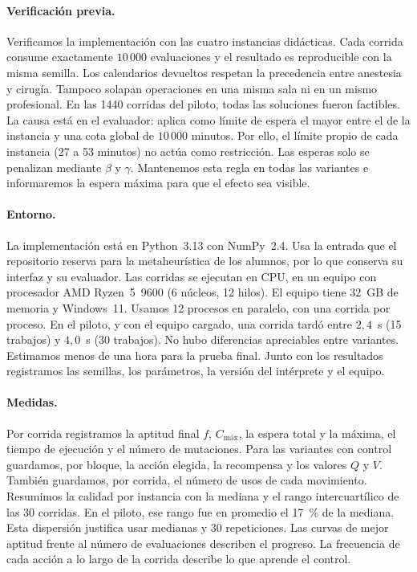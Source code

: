 \documentclass[10pt,a4paper]{article}
\newcommand{\Cmax}{C_{\text{máx}}}
\newcommand{\dc}{{,}}%
\begin{document}
\paragraph{Verificación previa.}
Verificamos la implementación con las cuatro instancias didácticas. Cada corrida consume
exactamente $10\,000$ evaluaciones y el resultado es reproducible con la misma semilla. Los
calendarios devueltos respetan la precedencia entre anestesia y cirugía. Tampoco solapan
operaciones en una misma sala ni en un mismo profesional. En las 1440 corridas del piloto, todas
las soluciones fueron factibles. La causa está en el evaluador: aplica como límite de espera el
mayor entre el de la instancia y una cota global de $10\,000$ minutos. Por ello, el límite
propio de cada instancia (27 a 53 minutos) no actúa como restricción. Las esperas solo se
penalizan mediante $\beta$ y $\gamma$. Mantenemos esta regla en todas las variantes e
informaremos la espera máxima para que el efecto sea visible.

\paragraph{Entorno.}
La implementación está en Python~3.13 con NumPy~2.4. Usa la entrada que el repositorio reserva
para la metaheurística de los alumnos, por lo que conserva su interfaz y su evaluador. Las
corridas se ejecutan en CPU, en un equipo con procesador AMD Ryzen~5~9600 (6 núcleos, 12 hilos).
El equipo tiene 32~GB de memoria y Windows~11. Usamos 12 procesos en paralelo, con una corrida
por proceso. En el piloto, y con el equipo cargado, una corrida tardó entre $2\dc4$~s (15
trabajos) y $4\dc0$~s (30 trabajos). No hubo diferencias apreciables entre variantes. Estimamos
menos de una hora para la prueba final. Junto con los resultados registramos las semillas, los
parámetros, la versión del intérprete y el equipo.

\paragraph{Medidas.}
Por corrida registramos la aptitud final $f$, $\Cmax$, la espera total y la máxima, el tiempo de
ejecución y el número de mutaciones. Para las variantes con control guardamos, por bloque, la
acción elegida, la recompensa y los valores $Q$ y $V$. También guardamos, por corrida, el número
de usos de cada movimiento. Resumimos la calidad por instancia con la mediana y el rango
intercuartílico de las 30 corridas. En el piloto, ese rango fue en promedio el 17~\% de la
mediana. Esta dispersión justifica usar medianas y 30 repeticiones. Las curvas de mejor aptitud
frente al número de evaluaciones describen el progreso. La frecuencia de cada acción a lo largo
de la corrida describe lo que aprende el control.
\end{document}
